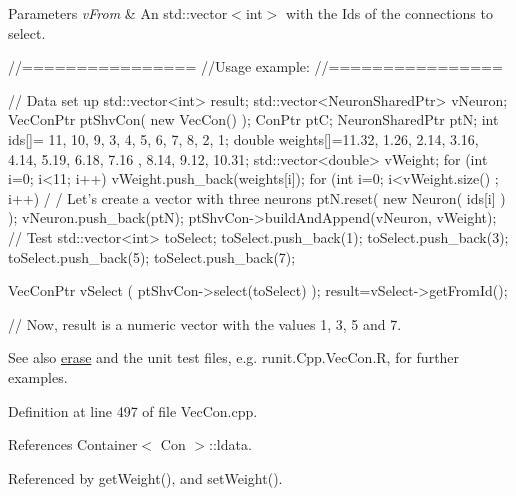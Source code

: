 \begin{DoxyParams}{Parameters}
{\em vFrom} & An std::vector$<$int$>$ with the Ids of the connections to select.\\
\hline
\end{DoxyParams}

\begin{DoxyCode}
        //================
        //Usage example:
        //================

        // Data set up
                std::vector<int> result;
                std::vector<NeuronSharedPtr> vNeuron;
                VecConPtr ptShvCon( new VecCon() );
                ConPtr    ptC;
                NeuronSharedPtr ptN;
                int ids[]= {11, 10, 9, 3, 4, 5, 6, 7, 8, 2, 1};
                double weights[]={11.32, 1.26, 2.14, 3.16, 4.14, 5.19, 6.18, 7.16
      , 8.14, 9.12, 10.31};
                std::vector<double> vWeight;
                for (int i=0; i<11; i++) {
                        vWeight.push_back(weights[i]);
                }
                for (int i=0; i<vWeight.size() ; i++) {                         /
      / Let's create a vector with three neurons
                        ptN.reset( new Neuron( ids[i] ) );
                        vNeuron.push_back(ptN);
                }
                ptShvCon->buildAndAppend(vNeuron, vWeight);
                // Test
                std::vector<int> toSelect;
                toSelect.push_back(1);
                toSelect.push_back(3);
                toSelect.push_back(5);
                toSelect.push_back(7);

                VecConPtr  vSelect (  ptShvCon->select(toSelect)  );
                result=vSelect->getFromId();

                // Now, result is a numeric vector with the values 1, 3, 5 and 7.
      
\end{DoxyCode}


\begin{DoxySeeAlso}{See also}
\hyperlink{classvec_con_aa9cc2fde90ddf466e820f929ead4fb0b}{erase} and the unit test files, e.g. runit.Cpp.VecCon.R, for further examples. 
\end{DoxySeeAlso}


Definition at line 497 of file VecCon.cpp.



References Container$<$ Con $>$::ldata.



Referenced by getWeight(), and setWeight().


